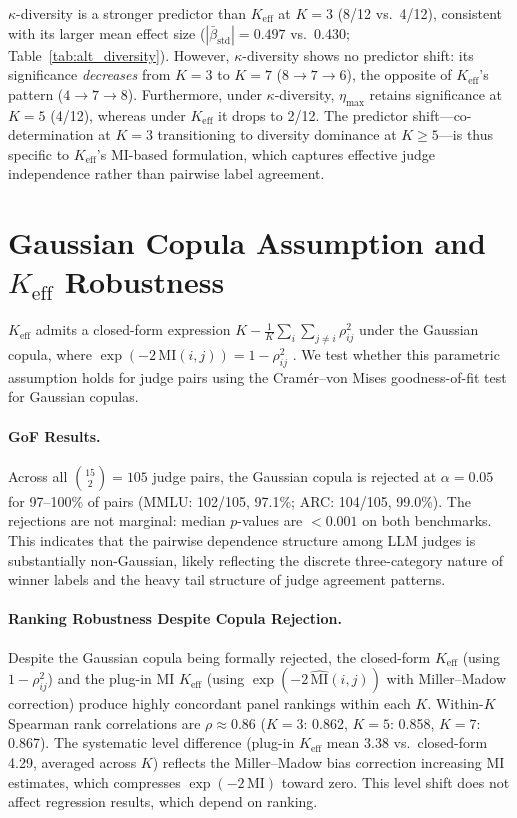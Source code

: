 $\kappa$-diversity is a stronger predictor than $K_{\mathrm{eff}}$ at $K{=}3$ (8/12 vs.\ 4/12), consistent with its larger mean effect size ($|\bar{\beta}_{\mathrm{std}}|{=}0.497$ vs.\ 0.430; Table~\ref{tab:alt_diversity}). However, $\kappa$-diversity shows no predictor shift: its significance \emph{decreases} from $K{=}3$ to $K{=}7$ ($8 \to 7 \to 6$), the opposite of $K_{\mathrm{eff}}$'s pattern ($4 \to 7 \to 8$). Furthermore, under $\kappa$-diversity, $\eta_{\max}$ retains significance at $K{=}5$ (4/12), whereas under $K_{\mathrm{eff}}$ it drops to 2/12. The predictor shift---co-determination at $K{=}3$ transitioning to diversity dominance at $K{\geq}5$---is thus specific to $K_{\mathrm{eff}}$'s MI-based formulation, which captures effective judge independence rather than pairwise label agreement.

\section{Gaussian Copula Assumption and $K_{\mathrm{eff}}$ Robustness}
\label{app:copula_gof}

$K_{\mathrm{eff}}$ admits a closed-form expression $K - \frac{1}{K}\sum_{i}\sum_{j \neq i} \rho_{ij}^2$ under the Gaussian copula, where $\exp(-2\,\mathrm{MI}(i,j)) = 1 - \rho_{ij}^2$ \citep{nelsen2006copulas}. We test whether this parametric assumption holds for judge pairs using the \citet{genest2008validity} Cram\'{e}r--von Mises goodness-of-fit test for Gaussian copulas.

\paragraph{GoF Results.} Across all $\binom{15}{2} = 105$ judge pairs, the Gaussian copula is rejected at $\alpha{=}0.05$ for 97--100\% of pairs (MMLU: 102/105, 97.1\%; ARC: 104/105, 99.0\%). The rejections are not marginal: median $p$-values are ${<}0.001$ on both benchmarks. This indicates that the pairwise dependence structure among LLM judges is substantially non-Gaussian, likely reflecting the discrete three-category nature of winner labels and the heavy tail structure of judge agreement patterns.

\paragraph{Ranking Robustness Despite Copula Rejection.} Despite the Gaussian copula being formally rejected, the closed-form $K_{\mathrm{eff}}$ (using $1 - \rho_{ij}^2$) and the plug-in MI $K_{\mathrm{eff}}$ (using $\exp(-2\,\widehat{\mathrm{MI}}(i,j))$ with Miller--Madow correction) produce highly concordant panel rankings within each $K$. Within-$K$ Spearman rank correlations are $\rho \approx 0.86$ ($K{=}3$: 0.862, $K{=}5$: 0.858, $K{=}7$: 0.867). The systematic level difference (plug-in $K_{\mathrm{eff}}$ mean 3.38 vs.\ closed-form 4.29, averaged across $K$) reflects the Miller--Madow bias correction increasing MI estimates, which compresses $\exp(-2\,\mathrm{MI})$ toward zero. This level shift does not affect regression results, which depend on ranking.

